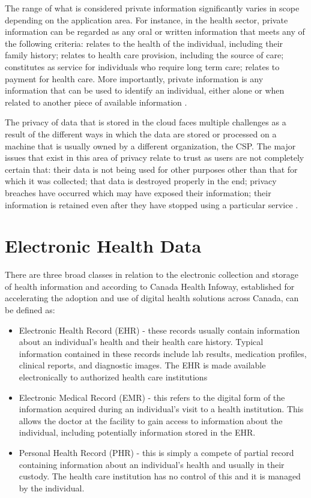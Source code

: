 The range of what is considered private information significantly varies in scope depending on the application area. For instance, in the health sector, private information can be regarded as any oral or written information that meets any of the following criteria: relates to the health of the individual, including their family history; relates to health care provision, including the source of care; constitutes as service for individuals who require long term care; relates to payment for health care. More importantly, private information is any information that can be used to identify an individual, either alone or when related to another piece of available information \cite{annpia}.

The privacy of data that is stored in the cloud faces multiple challenges as a result of the different ways in which the data are stored or processed on a machine that is usually owned by a different organization, the CSP. The major issues that exist in this area of privacy relate to trust as users are not completely certain that: their data is not being used for other purposes other than that for which it was collected; that data is destroyed properly in the end; privacy breaches have occurred which may have exposed their information; their information is retained even after they have stopped using a particular service \cite{pearsonprivacy}.

\section{Electronic Health Data}

There are three broad classes in relation to the electronic collection and storage of health information and according to Canada Health Infoway, established for accelerating the adoption and use of digital health solutions across Canada, can be defined as:

\begin{itemize}
	
	\item Electronic Health Record (EHR)\cite{caninfoway} - these records usually contain information about an individual's health and their health care history. Typical information contained in these records include lab results, medication profiles, clinical reports, and diagnostic images. The EHR is made available electronically to authorized health care institutions
	
	\item Electronic Medical Record (EMR)\cite{caninfoway} - this refers to the digital form of the information acquired during an individual's visit to a health institution. This allows the doctor at the facility to gain access to information about the individual, including potentially information stored in the EHR.
	
	\item Personal Health Record (PHR)\cite{caninfoway} - this is simply a compete of partial record containing information about an individual's health and usually in their custody. The health care institution has no control of this and it is managed by the individual.
	
\end{itemize}

